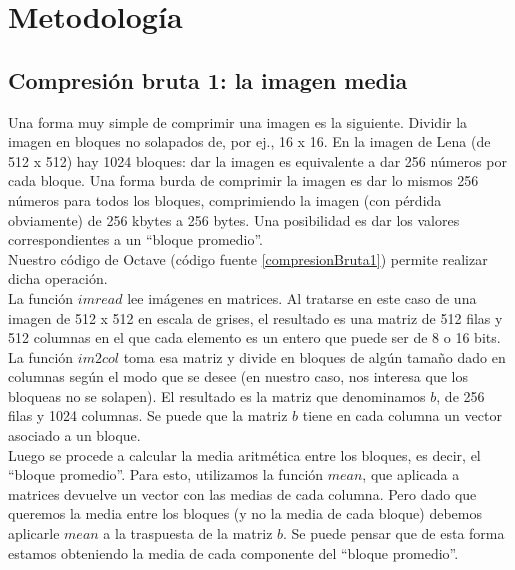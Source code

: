 \documentclass[twocolumn,a4paper,10pt]{article}
\begin{document}
\section{Metodología}

\subsection{Compresi\'on bruta 1: la imagen media}
\label{sec:compresion1}

Una forma muy simple de comprimir una imagen es la siguiente. Dividir la imagen en bloques no solapados de, por ej., 16 x 16. En la imagen de Lena (de 512 x 512) 
hay 1024 bloques: dar la imagen es equivalente a dar 256 n\'umeros por cada bloque. Una forma burda de comprimir la imagen es dar lo mismos 256 n\'umeros para todos 
los bloques, comprimiendo la imagen (con p\'erdida obviamente) de 256 kbytes a 256 bytes. Una posibilidad es dar los valores correspondientes a un ``bloque promedio''.\\

Nuestro c\'odigo de Octave (c\'odigo fuente \ref{compresionBruta1}) permite realizar dicha operaci\'on. \\

La funci\'on $imread$ lee im\'agenes en matrices. Al tratarse en este caso de una imagen de 512 x 512 en escala de grises, el resultado es una matriz de 512 filas y 
512 columnas en el que cada elemento es un entero que puede ser de 8 o 16 bits. La funci\'on $im2col$ toma esa matriz y divide en bloques de alg\'un tamaño dado en 
columnas seg\'un el modo que se desee (en nuestro caso, nos interesa que los bloqueas no se solapen). El resultado es la matriz que denominamos $b$, de 256 filas y 
1024 columnas. Se puede que la matriz $b$ tiene en cada columna un vector asociado a un bloque.  \\

Luego se procede a calcular la media aritm\'etica entre los bloques, es decir, el ``bloque promedio''. Para esto, utilizamos la funci\'on $mean$, que aplicada a 
matrices devuelve un vector con las medias de cada columna. Pero dado que queremos la media entre los bloques (y no la media de cada bloque) debemos aplicarle
$mean$ a la traspuesta de la matriz $b$. Se puede pensar que de esta forma estamos obteniendo la media de cada componente del ``bloque promedio''. \\
\end{document}
